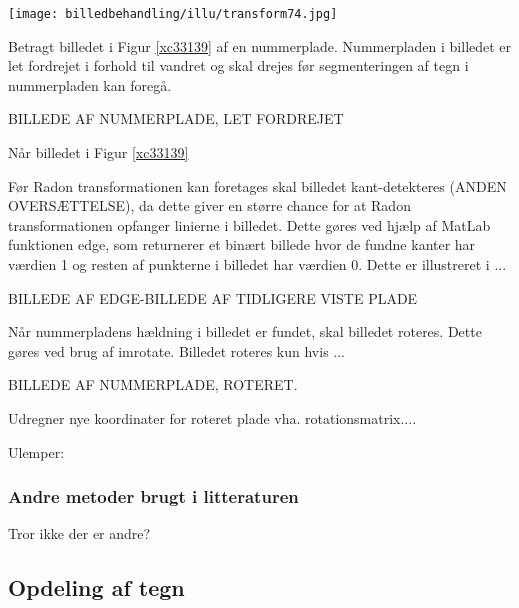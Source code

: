 \texttt{[image: billedbehandling/illu/transform74.jpg]}

Betragt billedet i Figur \ref{xc33139} af en nummerplade. Nummerpladen i billedet er let fordrejet i forhold til vandret og skal drejes før segmenteringen af tegn i nummerpladen kan foregå.

BILLEDE AF NUMMERPLADE, LET FORDREJET


Når billedet i Figur \ref{xc33139}

Før Radon transformationen kan foretages skal billedet kant-detekteres (ANDEN OVERSÆTTELSE), da dette giver en større chance for at Radon transformationen opfanger linierne i billedet. Dette gøres ved hjælp af MatLab funktionen edge, som returnerer et binært billede hvor de fundne kanter har værdien 1 og resten af punkterne i billedet har værdien 0. Dette er illustreret i ...

BILLEDE AF EDGE-BILLEDE AF TIDLIGERE VISTE PLADE


Når nummerpladens hældning i billedet er fundet, skal billedet roteres. Dette gøres ved brug af imrotate. Billedet roteres kun hvis ...

BILLEDE AF NUMMERPLADE, ROTERET.

Udregner nye koordinater for roteret plade vha. rotationsmatrix....

Ulemper:

\subsubsection*{Andre metoder brugt i litteraturen}

Tror ikke der er andre?

\subsection{Opdeling af tegn}

